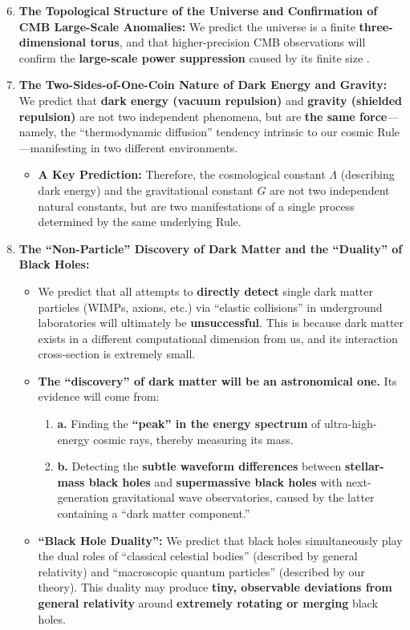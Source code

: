 \documentclass[11pt, a4paper]{article}
\begin{document}
\begin{enumerate}
    \setcounter{enumi}{5} %
    \item \textbf{The Topological Structure of the Universe and Confirmation of CMB Large-Scale Anomalies:}
    We predict the universe is a finite \textbf{three-dimensional torus}, and that higher-precision CMB observations will confirm the \textbf{large-scale power suppression} caused by its finite size \cite{Planck2020}.

    \item \textbf{The Two-Sides-of-One-Coin Nature of Dark Energy and Gravity:}
    We predict that \textbf{dark energy (vacuum repulsion)} and \textbf{gravity (shielded repulsion)} are not two independent phenomena, but are \textbf{the same force}—namely, the ``thermodynamic diffusion'' tendency intrinsic to our cosmic Rule—manifesting in two different environments.
    \begin{itemize}
        \item \textbf{A Key Prediction:} Therefore, the cosmological constant $\Lambda$ (describing dark energy) and the gravitational constant $G$ are not two independent natural constants, but are two manifestations of a single process determined by the same underlying Rule.
    \end{itemize}

    \item \textbf{The ``Non-Particle'' Discovery of Dark Matter and the ``Duality'' of Black Holes:}
    \begin{itemize}
        \item We predict that all attempts to \textbf{directly detect} single dark matter particles (WIMPs, axions, etc.) via ``elastic collisions'' in underground laboratories will ultimately be \textbf{unsuccessful}. This is because dark matter exists in a different computational dimension from us, and its interaction cross-section is extremely small.
        \item \textbf{The ``discovery'' of dark matter will be an astronomical one.} Its evidence will come from:
        \begin{enumerate}
            \item \textbf{a.} Finding the \textbf{``peak'' in the energy spectrum} of ultra-high-energy cosmic rays, thereby measuring its mass.
            \item \textbf{b.} Detecting the \textbf{subtle waveform differences} between \textbf{stellar-mass black holes} and \textbf{supermassive black holes} with next-generation gravitational wave observatories, caused by the latter containing a ``dark matter component.''
        \end{enumerate}
        \item \textbf{``Black Hole Duality'':} We predict that black holes simultaneously play the dual roles of ``classical celestial bodies'' (described by general relativity) and ``macroscopic quantum particles'' (described by our theory). This duality may produce \textbf{tiny, observable deviations from general relativity} around \textbf{extremely rotating or merging} black holes.
    \end{itemize}
\end{enumerate}
\end{document}
